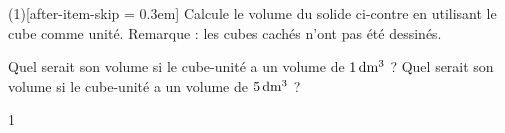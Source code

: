 \documentclass[a4paper,11pt]{report}
\begin{document}
\begin{exo}{
		\begin{minipage}[t]{0.6\textwidth}{
		\vspace{0pt}
		\begin{tasks}(1)[after-item-skip = 0.3em]
    \task Calcule le volume du solide ci-contre en utilisant le cube comme unité. Remarque : les cubes cachés n'ont pas été dessinés. 
\end{tasks}
		}
		\end{minipage}
		\begin{minipage}[t]{0.4\textwidth}{
		\vspace{0pt}
\begin{center}
\end{center}
		}
		\end{minipage}
		\begin{tasks}[after-item-skip = 0.3em]
			\task[b)] Quel serait  son volume si le cube-unité a un volume de $\tunit{1}{\deci m^3}$ ? 
			\task[c)] Quel serait  son volume si le cube-unité a un volume de $\tunit{5}{\deci m^3}$ ? 
\end{tasks}
}{1}
\end{exo}
\end{document}
